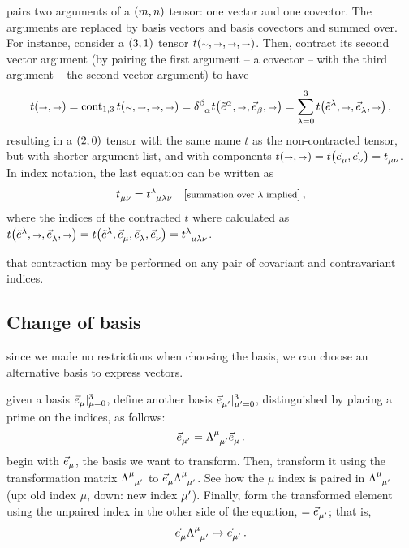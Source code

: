  pairs two arguments of a $\torder mn$ tensor: one vector and one covector. The arguments are replaced by basis vectors and basis covectors and summed over. For instance, consider a $\torder 31$ tensor $t\vat{\cslot,\vslot,\vslot,\vslot}$. Then, contract its second vector argument (by pairing the first argument -- a covector -- with the third argument -- the second vector argument) to have
%
\begin{equation}\label{eq:examplefofthecontractionofatensor}
  t\vat{\vslot,\vslot} = \cont_{1,3}t\vat{\cslot,\vslot,\vslot,\vslot}
                       = \tkron\beta\alpha t\vat{\tbcov\alpha, \vslot, \tbvec\beta,\vslot}
                       = \sum_{\lambda = 0}^{3}t\vat{\tbcov\lambda, \vslot, \tbvec\lambda,\vslot}\,,
\end{equation}
%
resulting in a $\torder 20$ tensor with the same name $t$ as the non-contracted tensor, but with shorter argument list, and with components $t\vat{\vslot,\vslot} = t\vat{\tbvec\mu,\tbvec\nu} = \tensor{t}{_\mu_\nu}$. In index notation, the last equation can be written as
%
\begin{equation}\label{eq:examplefofthecontractionofatensorindexnotation}
  \tensor{t}{_\mu_\nu} = \tensor{t}{^\lambda_\mu_\lambda_\nu}\quad\eqtxt{summation over $\lambda$ implied} \,,
\end{equation}
%
where the indices of the contracted $t$ where calculated as $t\vat{\tbcov\lambda,\vslot,\tbvec\lambda,\vslot} = t\vat{\tbcov\lambda,\tbvec\mu,\tbvec\lambda,\tbvec\nu} = \tensor{t}{^\lambda_\mu_\lambda_\nu}$.

 that contraction may be performed on any pair of covariant and contravariant indices.


\subsection{Change of basis}
%
 since we made no restrictions when choosing the basis, we can choose an alternative basis to express vectors.

 given a basis $\bset{\tbvec\mu}{\mu = 0}{3}$, define another basis $\bset{\atbvec\mu}{\aidx\mu = 0}{3}$, distinguished by placing a prime on the indices, as follows:
%
\begin{equation}\label{eq:changeofbasisvectors}
  \atbvec\mu = \ttransmat{\mu}{\aidx\mu}\tbvec\mu\,.
\end{equation}
%
 begin with $\tbvec\mu$, the basis we want to transform. Then, transform it using the transformation matrix $\ttransmat{\mu}{\aidx\mu}$ to $\tbvec\mu\ttransmat{\mu}{\aidx\mu}$. See how the $\mu$ index is paired in $\ttransmat{\mu}{\aidx\mu}$ (up: old index $\mu$, down: new index ${\mu}\sp{\prime}$). Finally, form the transformed element using the unpaired index in the other side of the equation, $= \tbvec{\aidx\mu}$; that is,
%
\begin{equation*}
  \tbvec\mu\ttransmat{\mu}{\aidx\mu} \mapsto \tbvec{\aidx\mu}\,.
\end{equation*}

